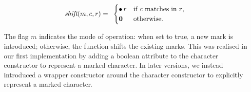 \documentclass[12pt]{article}
\newcommand{\ZERO}{\textbf{0}}
\newcommand{\shift}{\textit{shift}}
\newcommand{\Marked}[1]{\bullet\,#1}
\begin{document}
\[
\renewcommand{\arraystretch}{1.5}
\shift(m, c, r) =
\begin{array}{l}
  \begin{cases}
    \Marked{r} & \text{if $c$ matches in $r$}, \\
    \ZERO\, & \text{otherwise.}
  \end{cases}
\end{array}
\renewcommand{\arraystretch}{1.0}
\]

The flag $m$ indicates the mode of operation: when set to true, a new mark is introduced; otherwise, the function shifts the existing marks.  
This was realised in our first implementation by adding a boolean attribute to the character constructor to represent a marked character.  
In later versions, we instead introduced a wrapper constructor around the character constructor to explicitly represent a marked character.
\end{document}
